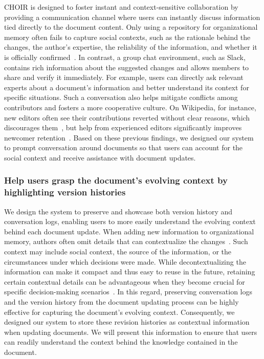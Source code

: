 \documentclass[sigconf,screen]{acmart}
\begin{document}
CHOIR is designed to foster instant and context-sensitive collaboration by providing a communication channel where users can instantly discuss information tied directly to the document content. Only using a repository for organizational memory often fails to capture social contexts, such as the rationale behind the changes, the author's expertise, the reliability of the information, and whether it is officially confirmed~\cite{ackerman2013sharing}. In contrast, a group chat environment, such as Slack, contains rich information about the suggested changes and allows members to share and verify it immediately. For example, users can directly ask relevant experts about a document's information and better understand its context for specific situations. Such a conversation also helps mitigate conflicts among contributors and fosters a more cooperative culture. On Wikipedia, for instance, new editors often see their contributions reverted without clear reasons, which discourages them~\cite{halfaker2011don}, but help from experienced editors significantly improves newcomer retention~\cite{morgan2013tea}. Based on these previous findings, we designed our system to prompt conversation around documents so that users can account for the social context and receive assistance with document updates.

\subsubsection{Help users grasp the document's evolving context by highlighting version histories}

We design the system to preserve and showcase both version history and conversation logs, enabling users to more easily understand the evolving context behind each document update. When adding new information to organizational memory, authors often omit details that can contextualize the changes~\cite{ackerman1999organizational}. Such context may include social context, the source of the information, or the circumstances under which decisions were made. While decontextualizing the information can make it compact and thus easy to reuse in the future, retaining certain contextual details can be advantageous when they become crucial for specific decision-making scenarios~\cite{young2006don}. In this regard, preserving conversation logs and the version history from the document updating process can be highly effective for capturing the document's evolving context. Consequently, we designed our system to store these revision histories as contextual information when updating documents. 
We will present this information to ensure that users can readily understand the context behind the knowledge contained in the document. 
\end{document}
